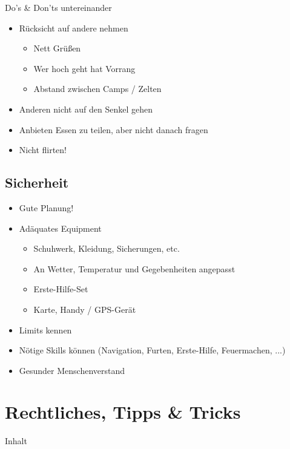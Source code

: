 \documentclass{beamer}
\begin{document}
			\begin{frame}{Do's \& Don'ts untereinander}
				\begin{itemize}
					\item Rücksicht auf andere nehmen
					\begin{itemize}
						\item Nett Grüßen
						\item Wer hoch geht hat Vorrang
						\item Abstand zwischen Camps / Zelten
					\end{itemize}
					\item Anderen nicht auf den Senkel gehen
					\item Anbieten Essen zu teilen, aber nicht danach fragen
					\item Nicht flirten!
				\end{itemize}
			\end{frame}
			
		\subsection{Sicherheit}
			
			\begin{frame}{}
				\begin{itemize}
					\item Gute Planung!
					\item Adäquates Equipment
					\begin{itemize}
						\item Schuhwerk, Kleidung, Sicherungen, etc.
						\item An Wetter, Temperatur und Gegebenheiten angepasst
						\item Erste-Hilfe-Set
						\item Karte, Handy / GPS-Gerät
					\end{itemize}
					\item Limits kennen
					\item Nötige Skills können (Navigation, Furten, Erste-Hilfe, Feuermachen, ...)\pause
					\item Gesunder Menschenverstand
				\end{itemize}
			\end{frame}
	
	\section{Rechtliches, Tipps \& Tricks}
		
		\begin{frame}[t]{Inhalt}
		\end{frame}
	
\end{document}
